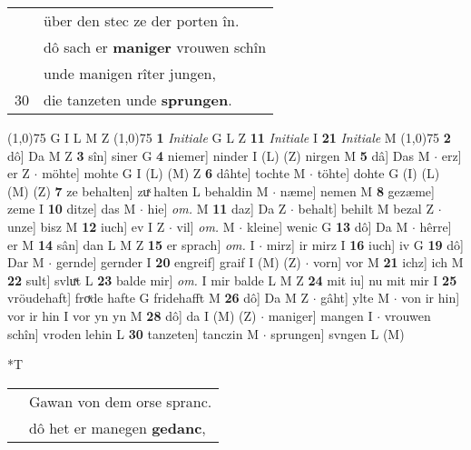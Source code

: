 \documentclass[8pt,a4paper,notitlepage]{article}
\begin{document}
\begin{table}[ht]
\begin{minipage}[t]{0.5\linewidth}
\begin{tabular}{rl}
 & über den stec ze der porten în.\\ 
 & dô sach er \textbf{maniger} vrouwen schîn\\ 
 & unde manigen rîter jungen,\\ 
30 & die tanzeten unde \textbf{sprungen}.\\ 
\end{tabular}
\scriptsize
\line(1,0){75} \newline
G I L M Z \newline
\line(1,0){75} \newline
\textbf{1} \textit{Initiale} G L Z  \textbf{11} \textit{Initiale} I  \textbf{21} \textit{Initiale} M  \newline
\line(1,0){75} \newline
\textbf{2} dô] Da M Z \textbf{3} sîn] siner G \textbf{4} niemer] ninder I (L) (Z) nirgen M \textbf{5} dâ] Das M  $\cdot$ erz] er Z  $\cdot$ möhte] mohte G I (L) (M) Z \textbf{6} dâhte] tochte M  $\cdot$ töhte] dohte G (I) (L) (M) (Z) \textbf{7} ze behalten] zuͯ halten L behaldin M  $\cdot$ næme] nemen M \textbf{8} gezæme] zeme I \textbf{10} ditze] das M  $\cdot$ hie] \textit{om.} M \textbf{11} daz] Da Z  $\cdot$ behalt] behilt M bezal Z  $\cdot$ unze] bisz M \textbf{12} iuch] ev I Z  $\cdot$ vil] \textit{om.} M  $\cdot$ kleine] wenic G \textbf{13} dô] Da M  $\cdot$ hêrre] er M \textbf{14} sân] dan L M Z \textbf{15} er sprach] \textit{om.} I  $\cdot$ mirz] ir mirz I \textbf{16} iuch] iv G \textbf{19} dô] Dar M  $\cdot$ gernde] gernder I \textbf{20} engreif] graif I (M) (Z)  $\cdot$ vorn] vor M \textbf{21} ichz] ich M \textbf{22} sult] svluͯt L \textbf{23} balde mir] \textit{om.} I mir balde L M Z \textbf{24} mit iu] nu mit mir I \textbf{25} vröudehaft] froͮde hafte G fridehafft M \textbf{26} dô] Da M Z  $\cdot$ gâht] ylte M  $\cdot$ von ir hin] vor ir hin I vor yn yn M \textbf{28} dô] da I (M) (Z)  $\cdot$ maniger] mangen I  $\cdot$ vrouwen schîn] vroden lehin L \textbf{30} tanzeten] tanczin M  $\cdot$ sprungen] svngen L (M) \newline
\end{minipage}
\hspace{0.5cm}
\begin{minipage}[t]{0.5\linewidth}
\small
\begin{center}*T
\end{center}
\begin{tabular}{rl}
 & Gawan von dem orse spranc.\\ 
 & dô het er manegen \textbf{gedanc},\\ 

\end{tabular}
\end{minipage}
\end{table}
\end{document}
